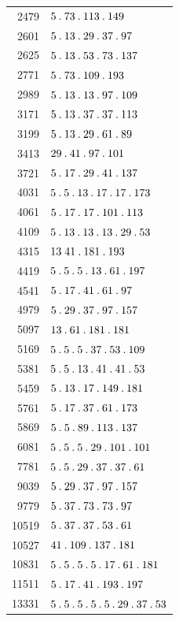 \begin{longtable}{@{}r|l@{}}
2479 & $5\pdot 73\pdot 113\pdot 149$\\
2601 & $5\pdot 13\pdot 29\pdot 37\pdot 97$\\
2625 & $5\pdot 13\pdot 53\pdot 73\pdot 137$\\
2771 & $5\pdot 73\pdot 109\pdot 193$\\
2989 & $5\pdot 13\pdot 13\pdot 97\pdot 109$\\
3171 & $5\pdot 13\pdot 37\pdot 37\pdot 113$\\
3199 & $5\pdot 13\pdot 29\pdot 61\pdot 89$\\
3413 & $29\pdot 41\pdot 97\pdot 101$\\
3721 & $5\pdot 17\pdot 29\pdot 41\pdot 137$\\
4031 & $5\pdot 5\pdot 13\pdot 17\pdot 17\pdot 173$\\
4061 & $5\pdot 17\pdot 17\pdot 101\pdot 113$\\
4109 & $5\pdot 13\pdot 13\pdot 13\pdot 29\pdot 53$\\
4315 & $13\;41\pdot 181\pdot 193$\\
4419 & $5\pdot 5\pdot 5\pdot 13\pdot 61\pdot 197$\\
4541 & $5\pdot 17\pdot 41\pdot 61\pdot 97$\\
4979 & $5\pdot 29\pdot 37\pdot 97\pdot 157$\\
5097 & $13\pdot 61\pdot 181\pdot 181$\\
5169 & $5\pdot 5\pdot 5\pdot 37\pdot 53\pdot 109$\\
5381 & $5\pdot 5\pdot 13\pdot 41\pdot 41\pdot 53$\\
5459 & $5\pdot 13\pdot 17\pdot 149\pdot 181$\\
5761 & $5\pdot 17\pdot 37\pdot 61\pdot 173$\\
5869 & $5\pdot 5\pdot 89\pdot 113\pdot 137$\\
6081 & $5\pdot 5\pdot 5\pdot 29\pdot 101\pdot 101$\\
7781 & $5\pdot 5\pdot 29\pdot 37\pdot 37\pdot 61$\\
9039 & $5\pdot 29\pdot 37\pdot 97\pdot 157$\\
9779 & $5\pdot 37\pdot 73\pdot 73\pdot 97$\\
10519 & $5\pdot 37\pdot 37\pdot 53\pdot 61$\\
10527 & $41\pdot 109\pdot 137\pdot 181$\\
10831 & $5\pdot 5\pdot 5\pdot 5\pdot 17\pdot 61\pdot 181$\\
11511 & $5\pdot 17\pdot 41\pdot 193\pdot 197$\\
13331 & $5\pdot 5\pdot 5\pdot 5\pdot 5\pdot 29\pdot 37\pdot 53$\\

\end{longtable}
